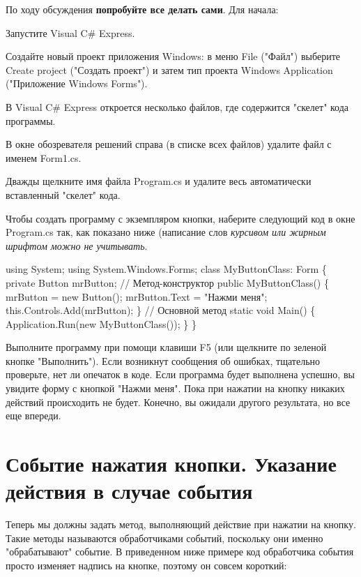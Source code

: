 \documentclass[12pt, a4paper]{article}
\begin{document}
По ходу обсуждения \textbf{попробуйте все делать сами}. Для начала:\\

\begin{itemize} {
\item{Запустите Visual C\# Express.}
\item{Создайте новый проект приложения Windows: в меню File ("Файл") выберите Create project ("Создать проект") и затем тип проекта Windows Application ("Приложение Windows Forms").}
\item{В Visual C\# Express откроется несколько файлов, где содержится "скелет" кода программы.}
\item{В окне обозревателя решений справа (в списке всех файлов) удалите файл с именем Form1.cs.}
\item{Дважды щелкните имя файла Program.cs и удалите весь автоматически вставленный "скелет" кода.}
\item{Чтобы создать программу с экземпляром кнопки, наберите следующий код в окне Program.cs так, как показано ниже (написание слов \textit{курсивом или жирным шрифтом можно не учитывать}.}
} \end{itemize}

\begin{spverbatim}using System;
using System.Windows.Forms;
class MyButtonClass: Form
\{
    private Button mrButton;
    // Метод-конструктор
    public MyButtonClass()
    \{
        mrButton = new Button();
        mrButton.Text = "Нажми меня";
        this.Controls.Add(mrButton);
    \}
    // Основной метод
    static void Main()
    \{
        Application.Run(new MyButtonClass());
    \}
\}\end{spverbatim}

Выполните программу при помощи клавиши F5 (или щелкните по зеленой кнопке "Выполнить"). Если возникнут сообщения об ошибках, тщательно проверьте, нет ли опечаток в коде. Если программа будет выполнена успешно, вы увидите форму с кнопкой "Нажми меня". Пока при нажатии на кнопку никаких действий происходить не будет. Конечно, вы ожидали другого результата, но все еще впереди.\\

\section{Событие нажатия кнопки. Указание действия в случае события}
Теперь мы должны задать метод, выполняющий действие при нажатии на кнопку. Такие методы называются обработчиками событий, поскольку они именно "обрабатывают" событие. В приведенном ниже примере код обработчика события просто изменяет надпись на кнопке, поэтому он совсем короткий:\\
\end{document}
